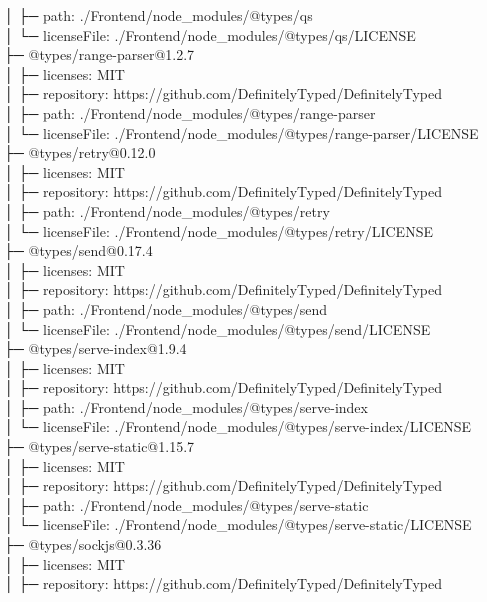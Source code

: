 │  ├─ path: ./Frontend/node\_modules/@types/qs\\
│  └─ licenseFile: ./Frontend/node\_modules/@types/qs/LICENSE\\
├─ @types/range-parser@1.2.7\\
│  ├─ licenses: MIT\\
│  ├─ repository: https://github.com/DefinitelyTyped/DefinitelyTyped\\
│  ├─ path: ./Frontend/node\_modules/@types/range-parser\\
│  └─ licenseFile: ./Frontend/node\_modules/@types/range-parser/LICENSE\\
├─ @types/retry@0.12.0\\
│  ├─ licenses: MIT\\
│  ├─ repository: https://github.com/DefinitelyTyped/DefinitelyTyped\\
│  ├─ path: ./Frontend/node\_modules/@types/retry\\
│  └─ licenseFile: ./Frontend/node\_modules/@types/retry/LICENSE\\
├─ @types/send@0.17.4\\
│  ├─ licenses: MIT\\
│  ├─ repository: https://github.com/DefinitelyTyped/DefinitelyTyped\\
│  ├─ path: ./Frontend/node\_modules/@types/send\\
│  └─ licenseFile: ./Frontend/node\_modules/@types/send/LICENSE\\
├─ @types/serve-index@1.9.4\\
│  ├─ licenses: MIT\\
│  ├─ repository: https://github.com/DefinitelyTyped/DefinitelyTyped\\
│  ├─ path: ./Frontend/node\_modules/@types/serve-index\\
│  └─ licenseFile: ./Frontend/node\_modules/@types/serve-index/LICENSE\\
├─ @types/serve-static@1.15.7\\
│  ├─ licenses: MIT\\
│  ├─ repository: https://github.com/DefinitelyTyped/DefinitelyTyped\\
│  ├─ path: ./Frontend/node\_modules/@types/serve-static\\
│  └─ licenseFile: ./Frontend/node\_modules/@types/serve-static/LICENSE\\
├─ @types/sockjs@0.3.36\\
│  ├─ licenses: MIT\\
│  ├─ repository: https://github.com/DefinitelyTyped/DefinitelyTyped\\
